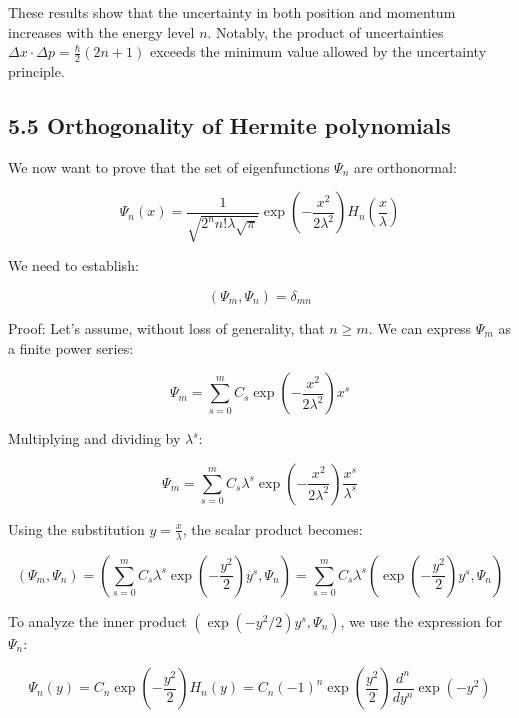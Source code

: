 \documentclass[10pt]{article}
\begin{document}
These results show that the uncertainty in both position and momentum increases with the energy level $n$. Notably, the product of uncertainties $\Delta x \cdot \Delta p = \frac{\hbar}{2}(2n+1)$ exceeds the minimum value allowed by the uncertainty principle.

\subsection*{5.5 Orthogonality of Hermite polynomials}

We now want to prove that the set of eigenfunctions $\Psi_n$ are orthonormal:

\begin{equation*}
\Psi_n(x) = \frac{1}{\sqrt{2^n n!\lambda\sqrt{\pi}}}\exp\left(-\frac{x^2}{2\lambda^2}\right)H_n\left(\frac{x}{\lambda}\right) \tag{5.63}
\end{equation*}

We need to establish:

\begin{equation*}
(\Psi_m, \Psi_n) = \delta_{mn} \tag{5.64}
\end{equation*}

Proof: Let's assume, without loss of generality, that $n \geq m$. We can express $\Psi_m$ as a finite power series:

\begin{equation*}
\Psi_m = \sum_{s=0}^m C_s\exp\left(-\frac{x^2}{2\lambda^2}\right)x^s \tag{5.65}
\end{equation*}

Multiplying and dividing by $\lambda^s$:

\begin{equation*}
\Psi_m = \sum_{s=0}^m C_s\lambda^s\exp\left(-\frac{x^2}{2\lambda^2}\right)\frac{x^s}{\lambda^s} \tag{5.66}
\end{equation*}

Using the substitution $y = \frac{x}{\lambda}$, the scalar product becomes:

\begin{equation*}
(\Psi_m, \Psi_n) = \left(\sum_{s=0}^m C_s\lambda^s\exp\left(-\frac{y^2}{2}\right)y^s, \Psi_n\right) = \sum_{s=0}^m C_s\lambda^s\left(\exp\left(-\frac{y^2}{2}\right)y^s, \Psi_n\right) \tag{5.67}
\end{equation*}

To analyze the inner product $\left(\exp\left(-y^2/2\right)y^s, \Psi_n\right)$, we use the expression for $\Psi_n$:

\begin{equation*}
\Psi_n(y) = C_n\exp\left(-\frac{y^2}{2}\right)H_n(y) = C_n(-1)^n\exp\left(\frac{y^2}{2}\right)\frac{d^n}{dy^n}\exp(-y^2) \tag{5.68}
\end{equation*}
\end{document}
